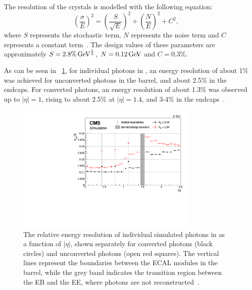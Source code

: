 The resolution of the \ECAL crystals is modelled with the following equation:
\begin{equation} 
\left( \frac{\sigma}{E}\right) ^2= \left( \frac{S}{\sqrt{E}} \right)^2 + \left( \frac{N}{E} \right)^2 + C^2,
\end{equation}
where $S$ represents the stochastic term, $N$ represents the noise term and $C$ represents a constant term~\cite{CMSTDR}. The design values of these parameters are approximately $S=2.8\%\,\text{Ge\hspace{-.08em}V}^\frac{1}{2}$, $ N= 0.12\,\text{Ge\hspace{-.08em}V}$ and $C=0.3 \%$. 

As can be seen in \Fig~\ref{fig:det:energy_resol}, for individual \Hgg photons in \RunI, an energy resolution of about 1\% was achieved for unconverted photons in the barrel, and about 2.5\% in the endcaps. For converted photons, an energy resolution of about 1.3\% was observed up to $|\eta| = 1$, rising to about 2.5\% at $|\eta| = 1.4$, and 3-4\% in the endcaps~\cite{CMS-PAS-EGM-14-001}.

\begin{figure}[h]
\centering
\includegraphics[width=0.8\textwidth]{detectorFigures/effSigma_vs_Eta_mva.pdf}
\caption[The relative energy resolution of individual simulated \Hgg photons in \RunI as a function of $|\eta|$, shown separately for converted photons (black circles) and unconverted photons (open red squares). The vertical lines represent the boundaries between the ECAL modules in the barrel, while the grey band indicates the transition region between the EB and the EE, where photons are not reconstructed\quad\cite{CMS-PAS-EGM-14-001}.]{The relative energy resolution of individual simulated \Hgg photons in \RunI as a function of $|\eta|$, shown separately for converted photons (black circles) and unconverted photons (open red squares). The vertical lines represent the boundaries between the ECAL modules in the barrel, while the grey band indicates the transition region between the EB and the EE, where photons are not reconstructed~\cite{CMS-PAS-EGM-14-001}.}
\label{fig:det:energy_resol}
\end{figure}

